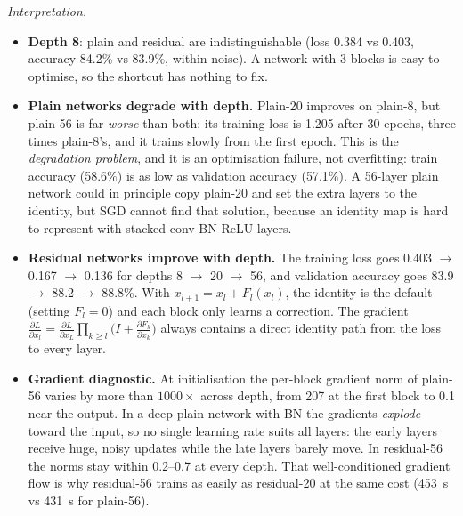 \documentclass[10pt,a4paper]{article}
\begin{document}
\textit{Interpretation.}
\begin{itemize}
\item \textbf{Depth 8}: plain and residual are indistinguishable (loss 0.384 vs 0.403, accuracy 84.2\% vs 83.9\%, within noise).
A network with 3 blocks is easy to optimise, so the shortcut has nothing to fix.
\item \textbf{Plain networks degrade with depth.} Plain-20 improves on plain-8, but plain-56 is far \emph{worse} than both: its
training loss is 1.205 after 30 epochs, three times plain-8's, and it trains slowly from the first epoch. This is the
\emph{degradation problem}, and it is an optimisation failure, not overfitting: train accuracy (58.6\%) is as low as validation
accuracy (57.1\%). A 56-layer plain network could in principle copy plain-20 and set the extra layers to the identity, but SGD cannot
find that solution, because an identity map is hard to represent with stacked conv-BN-ReLU layers.
\item \textbf{Residual networks improve with depth.} The training loss goes 0.403 $\to$ 0.167 $\to$ 0.136 for depths 8 $\to$ 20 $\to$ 56,
and validation accuracy goes 83.9 $\to$ 88.2 $\to$ 88.8\%. With $x_{l+1}=x_l+F_l(x_l)$, the identity is the default (setting $F_l=0$)
and each block only learns a correction. The gradient
$\frac{\partial L}{\partial x_l}=\frac{\partial L}{\partial x_L}\prod_{k\ge l}\big(I+\frac{\partial F_k}{\partial x_k}\big)$ always
contains a direct identity path from the loss to every layer.
\item \textbf{Gradient diagnostic.} At initialisation the per-block gradient norm of plain-56 varies by more than $1000\times$ across
depth, from 207 at the first block to 0.1 near the output. In a deep plain network with BN the gradients \emph{explode} toward the
input, so no single learning rate suits all layers: the early layers receive huge, noisy updates while the late layers barely move.
In residual-56 the norms stay within 0.2--0.7 at every depth. That well-conditioned gradient flow is why residual-56 trains as easily
as residual-20 at the same cost (453~s vs 431~s for plain-56).
\end{itemize}

\end{document}
